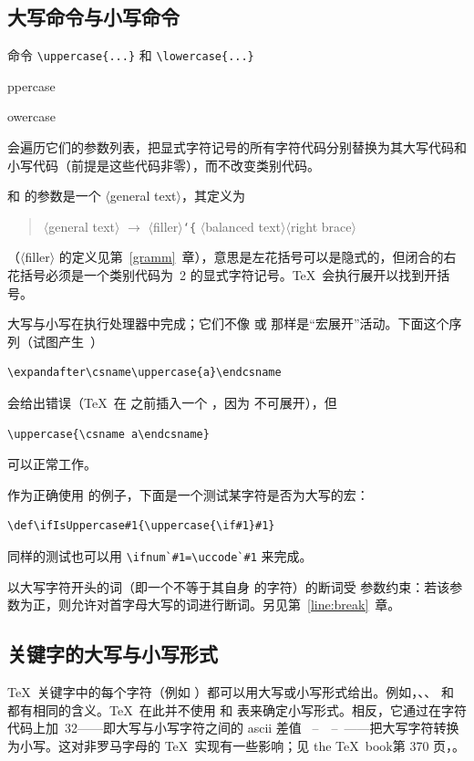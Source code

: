 \documentclass[a4paper]{rapport3}
\makeatletter
\def\lb{{\tt\char`\{}}\def\rb{{\tt\char`\}}}
\def\gr#1{$\langle$#1$\rangle$}\def\key#1{{\tt#1}}
\def\ldash{\unskip\ --\nobreak\ \ignorespaces}
\def\rdash{\unskip\nobreak\ --\ \ignorespaces}
\def\ascii{{\sc ascii}}
\def\TeXbook{the \TeX\ book}\def\web{{\sc web}}
\newenvironment{Disp}{\begin{quotation}}{\end{quotation}}
\def\cstoidx#1\par{\index{#1@\cs{#1}}}
\makeatother
\begin{document}
\subsection{大写命令与小写命令}
\label{upcase}

命令 \verb-\uppercase{...}- 和 \verb-\lowercase{...}-
\cstoidx uppercase\par\cstoidx lowercase\par
会遍历它们的参数列表，把显式字符记号的所有字符代码分别替换为其大写代码和小写代码（前提是这些代码非零），而不改变类别代码。
\awp

 和  的参数是一个 \gr{general text}，其定义为
\begin{Disp} \gr{general text} $\longrightarrow$ \gr{filler}\lb
      \gr{balanced text}\gr{right brace}\end{Disp}
（\gr{filler} 的定义见第~\ref{gramm}~章），意思是左花括号可以是隐式的，但闭合的右花括号必须是一个类别代码为~2 的显式字符记号。\TeX\ 会执行展开以找到开括号。

大写与小写在执行处理器中完成；它们不像  或  那样是“宏展开”活动。下面这个序列（试图产生~）
\begin{verbatim}
\expandafter\csname\uppercase{a}\endcsname
\end{verbatim}
会给出错误（\TeX\ 在  之前插入一个 ，因为  不可展开），但
\begin{verbatim}
\uppercase{\csname a\endcsname}
\end{verbatim}
可以正常工作。

作为正确使用  的例子，下面是一个测试某字符是否为大写的宏：
\begin{verbatim}
\def\ifIsUppercase#1{\uppercase{\if#1}#1}
\end{verbatim}
同样的测试也可以用 \verb>\ifnum`#1=\uccode`#1> 来完成。

以大写字符开头的词（即一个不等于其自身  的字符）的断词受  参数约束：若该参数为正，则允许对首字母大写的词进行断词。另见第~\ref{line:break}~章。

\subsection{关键字的大写与小写形式}

\TeX\ 关键字中的每个字符（例如 ）都可以用大写或小写形式给出。例如，、、 和~ 都有相同的含义。\TeX\ 在此并不使用  和  表来确定小写形式。相反，它通过在字符代码上加~32——即大写与小写字符之间的 \ascii{} 差值 \ldash \rdash——把大写字符转换为小写。这对非罗马字母的 \TeX\ 实现有一些影响；见 \TeXbook 第 370 页，\cite{Knuth:TeXbook}。
\end{document}
